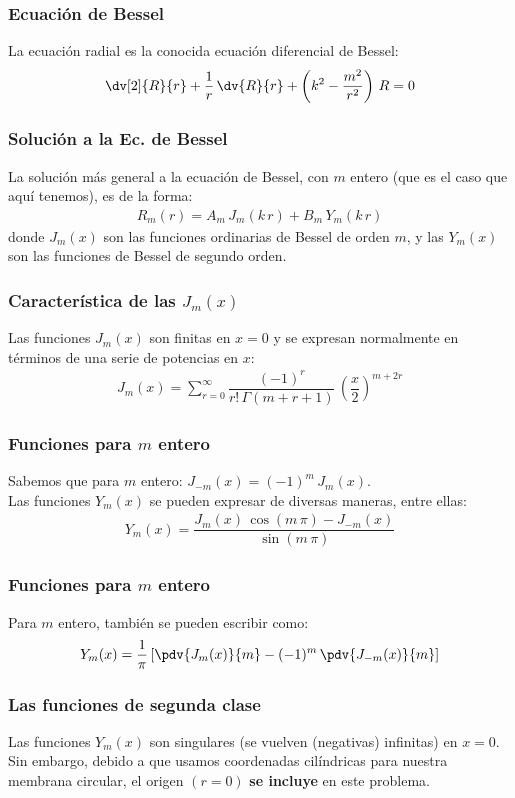 \begin{frame}
\frametitle{Ecuación de Bessel}
La ecuación radial es la conocida ecuación diferencial de Bessel:
\begin{align*}
\dv[2]{R}{r} + \dfrac{1}{r} \, \dv{R}{r} + \left( k^{2} - \dfrac{m^{2}}{r^{2}} \right) \, R = 0
\end{align*}
\end{frame}
\begin{frame}
\frametitle{Solución a la Ec. de Bessel}
La solución más general a la ecuación de Bessel, con $m$ entero (que es el caso que aquí tenemos), es de la forma:
\begin{align*}
R_{m} (r) = A_{m} \, J_{m} (k \, r) + B_{m} \, Y_{m} (k \, r)
\end{align*}
donde $J_{m} (x)$ son las funciones ordinarias de Bessel de orden $m$, y las $Y_{m} (x)$ son las funciones de Bessel de segundo orden.
\end{frame}
\begin{frame}
\frametitle{Característica de las $J_{m} (x)$}
Las funciones $J_{m} (x)$ son finitas en $x = 0$ y se expresan normalmente en términos de una serie de potencias en $x$:
\begin{align*}
J_{m} (x) = \sum_{r=0}^{\infty} \dfrac{(-1)^{r}}{r! \, \Gamma(m + r + 1)} \, \left( \dfrac{x}{2} \right)^{m+2r}
\end{align*}
\end{frame}
\begin{frame}
\frametitle{Funciones para $m$ entero}
Sabemos que para $m$ entero: $J_{-m}(x) = (-1)^{m} \, J_{m}(x)$.
\\
\bigskip
\pause
Las funciones $Y_{m}(x)$ se pueden expresar de diversas maneras, entre ellas:
\begin{align*}
Y_{m}(x) = \dfrac{J_{m}(x) \, \cos (m \, \pi) - J_{-m}(x)}{\sin (m \, \pi)}
\end{align*}
\end{frame}
\begin{frame}
\frametitle{Funciones para $m$ entero}
Para $m$ entero, también se pueden escribir como:
\begin{align*}
Y_{m}(x) = \dfrac{1}{\pi} \left[ \pdv{J_{m}(x)}{m} - (-1)^{m} \, \pdv{J_{-m}(x)}{m} \right]
\end{align*}
\end{frame}
\begin{frame}
\frametitle{Las funciones de segunda clase}
Las funciones $Y_{m} (x)$ son singulares (se vuelven (negativas) infinitas) en $x = 0$.
\\
\bigskip
\pause
Sin embargo, debido a que usamos coordenadas cilíndricas para nuestra membrana circular, el origen $(r = 0)$ \textbf{se incluye} en este problema.
\end{frame}
